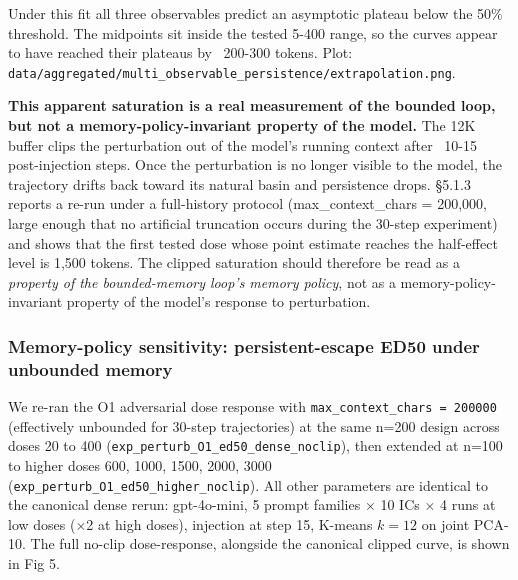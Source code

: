\documentclass{article}
\theoremstyle{plain}
\theoremstyle{definition}
\begin{document}
Under this fit all three observables predict an asymptotic plateau below the 50\% threshold. The midpoints sit inside the tested 5-400 range, so the curves appear to have reached their plateaus by ~200-300 tokens. Plot: \texttt{data/aggregated/multi\_observable\_persistence/extrapolation.png}.

\textbf{This apparent saturation is a real measurement of the bounded loop, but not a memory-policy-invariant property of the model.} The 12K buffer clips the perturbation out of the model's running context after ~10-15 post-injection steps. Once the perturbation is no longer visible to the model, the trajectory drifts back toward its natural basin and persistence drops. §5.1.3 reports a re-run under a full-history protocol (max\_context\_chars = 200,000, large enough that no artificial truncation occurs during the 30-step experiment) and shows that the first tested dose whose point estimate reaches the half-effect level is 1,500 tokens. The clipped saturation should therefore be read as a \textit{property of the bounded-memory loop's memory policy}, not as a memory-policy-invariant property of the model's response to perturbation.

\subsubsection{Memory-policy sensitivity: persistent-escape ED50 under unbounded memory}

We re-ran the O1 adversarial dose response with \texttt{max\_context\_chars = 200000} (effectively unbounded for 30-step trajectories) at the same n=200 design across doses 20 to 400 (\texttt{exp\_perturb\_O1\_ed50\_dense\_noclip}), then extended at n=100 to higher doses 600, 1000, 1500, 2000, 3000 (\texttt{exp\_perturb\_O1\_ed50\_higher\_noclip}). All other parameters are identical to the canonical dense rerun: gpt-4o-mini, 5 prompt families × 10 ICs × 4 runs at low doses (×2 at high doses), injection at step 15, K-means $k=12$ on joint PCA-10. The full no-clip dose-response, alongside the canonical clipped curve, is shown in Fig 5.
\end{document}
